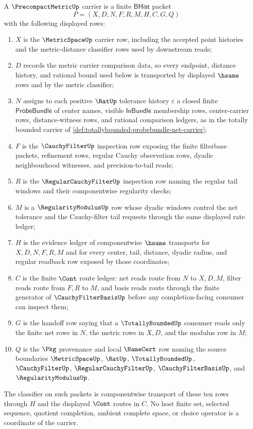 \begin{definition}
\label{def:precompact-metric-carrier}
A $\PrecompactMetricUp$ carrier is a finite $\mathsf{BHist}$ packet
$$
P=(X,D,N,F,R,M,H,C,G,Q)
$$
with the following displayed rows:
\begin{enumerate}
\item $X$ is the $\MetricSpaceUp$ carrier row, including the accepted point
  histories and the metric-distance classifier rows used by downstream reads;
\item $D$ records the metric carrier comparison data, so every endpoint,
  distance history, and rational bound used below is transported by displayed
  $\hsame$ rows and by the metric classifier;
\item $N$ assigns to each positive $\RatUp$ tolerance history $\varepsilon$ a
  closed finite $\mathsf{ProbeBundle}$ of center names, visible
  $\mathsf{InBundle}$ membership rows, center-carrier rows, distance-witness
  rows, and rational comparison ledgers, as in the totally bounded carrier of
  \autoref{def:totallybounded-probebundle-net-carrier};
\item $F$ is the $\CauchyFilterUp$ inspection row exposing the finite
  filterbase packets, refinement rows, regular Cauchy observation rows,
  dyadic neighbourhood witnesses, and precision-to-tail reads;
\item $R$ is the $\RegularCauchyFilterUp$ inspection row naming the regular
  tail windows and their componentwise regularity checks;
\item $M$ is a $\RegularityModulusUp$ row whose dyadic windows control the
  net tolerance and the Cauchy-filter tail requests through the same displayed
  rate ledger;
\item $H$ is the evidence ledger of componentwise $\hsame$ transports for
  $X,D,N,F,R,M$ and for every center, tail, distance, dyadic radius, and
  regular readback row exposed by those coordinates;
\item $C$ is the finite $\Cont$ route ledger: net reads route from $N$ to
  $X,D,M$, filter reads route from $F,R$ to $M$, and basis reads route through
  the finite generator of $\CauchyFilterBasisUp$ before any completion-facing
  consumer can inspect them;
\item $G$ is the handoff row saying that a $\TotallyBoundedUp$ consumer reads
  only the finite net rows in $N$, the metric rows in $X,D$, and the modulus
  row in $M$;
\item $Q$ is the $\Pkg$ provenance and local $\NameCert$ row naming the
  source boundaries $\MetricSpaceUp$, $\RatUp$, $\TotallyBoundedUp$,
  $\CauchyFilterUp$, $\RegularCauchyFilterUp$, $\CauchyFilterBasisUp$, and
  $\RegularityModulusUp$.
\end{enumerate}
The classifier on such packets is componentwise transport of these ten rows
through $H$ and the displayed $\Cont$ routes in $C$. No host finite set,
selected sequence, quotient completion, ambient complete space, or choice
operator is a coordinate of the carrier.
\end{definition}

